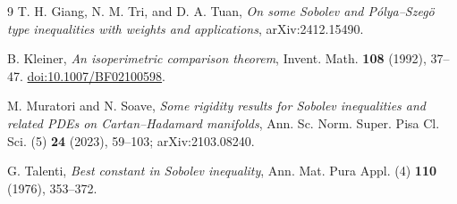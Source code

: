 \documentclass[11pt]{article}
\begin{document}
\begin{thebibliography}{9}
T. H. Giang, N. M. Tri, and D. A. Tuan,
\emph{On some Sobolev and P\'olya--Szeg\"o type inequalities with weights
and applications}, arXiv:2412.15490.

B. Kleiner,
\emph{An isoperimetric comparison theorem},
Invent. Math. \textbf{108} (1992), 37--47.
\href{https://doi.org/10.1007/BF02100598}{doi:10.1007/BF02100598}.

M. Muratori and N. Soave,
\emph{Some rigidity results for Sobolev inequalities and related PDEs on
Cartan--Hadamard manifolds}, Ann. Sc. Norm. Super. Pisa Cl. Sci. (5)
\textbf{24} (2023), 59--103; arXiv:2103.08240.

G. Talenti,
\emph{Best constant in Sobolev inequality},
Ann. Mat. Pura Appl. (4) \textbf{110} (1976), 353--372.
\end{thebibliography}
\end{document}
